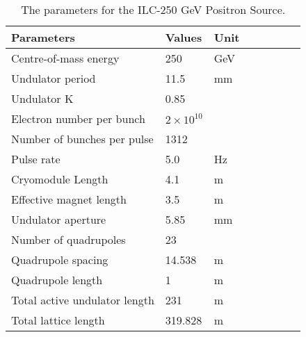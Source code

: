 \documentclass[a4paper]{article}
\begin{document}
\begin{table}[h]

\caption[ILC undulator parameters]{The parameters for the ILC-250 GeV Positron Source.}
\centering %
\begin{tabular}{l*{6}{l}r} %
\hline\hline %
Parameters & Values & Unit \\ [0.5ex] %

\hline %
Centre-of-mass energy  & 250 & GeV  \\ %
Undulator period & 11.5 & mm\\
Undulator K & 0.85 \\
Electron number per bunch & $2\times10^{10}$ \\
Number of bunches per pulse & 1312 \\
Pulse rate &  5.0 & Hz \\
Cryomodule Length & 4.1&  m \\ 
Effective magnet length & 3.5 & m \\
Undulator aperture & 5.85 &mm \\
Number of quadrupoles  & 23 \\ 
Quadrupole spacing & 14.538 & m\\
Quadrupole length & 1&  m \\
Total active undulator length & 231&  m \\
Total lattice length & 319.828 & m \\


\hline %
\end{tabular}
\label{table1} %
\end{table}
\end{document}
